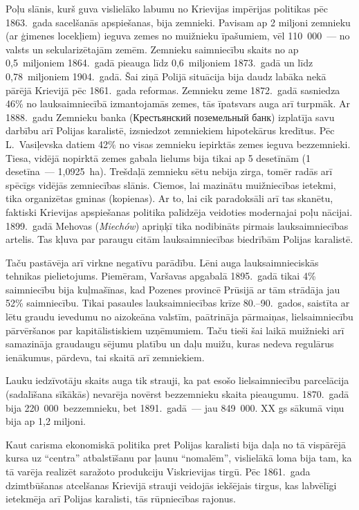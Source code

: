 \documentclass[twoside,a5paper,12pt,fleqn,openany]{extbook}
\newcommand{\pltxti}[1]{\textit{\textpolish{#1}}}
\newcommand{\rutxti}[1]{\textrussian{#1}}
\begin{document}
Poļu slānis, kurš guva vislielāko labumu no Krievijas impērijas politikas pēc 1863.~gada sacelšanās apspiešanas, bija zemnieki. Pavisam ap 2 miljoni zemnieku (ar ģimenes locekļiem) ieguva zemes no muižnieku īpašumiem, vēl 110~000~--- no valsts un sekularizētajām zemēm. Zemnieku saimniecību skaits no ap 0,5~miljoniem 1864.~gadā pieauga līdz 0,6~miljoniem 1873.~gadā un līdz 0,78~miljoniem 1904.~gadā. Šai ziņā Polijā situācija bija daudz labāka nekā pārējā Krievijā pēc 1861.~gada reformas. Zemnieku zeme 1872.~gadā sasniedza 46\% no lauksaimniecībā izmantojamās zemes, tās īpatsvars auga arī turpmāk. Ar 1888.~gadu Zemnieku banka (\rutxti{Крестьянский поземельный банк}) izplatīja savu darbību arī Polijas karalistē, izsniedzot zemniekiem hipotekārus kredītus. Pēc L.~Vasiļevska datiem 42\% no visas zemnieku iepirktās zemes ieguva bezzemnieki. Tiesa, vidējā nopirktā zemes gabala lielums bija tikai ap 5 desetīnām (1 desetīna~--- 1,0925~ha). Trešdaļā zemnieku sētu nebija zirga, tomēr radās arī spēcīgs vidējās zemniecības slānis. Ciemos, lai mazinātu muižniecības ietekmi, tika organizētas gminas (kopienas). Ar to, lai cik paradoksāli arī tas skanētu, faktiski Krievijas apspiešanas politika palīdzēja veidoties modernajai poļu nācijai. 1899.~gadā Mehovas (\pltxti{Miechów}) apriņķī tika nodibināts pirmais lauksaimniecības artelis. Tas kļuva par paraugu citām lauksaimniecības biedrībām Polijas karalistē.

Taču pastāvēja arī virkne negatīvu parādību. Lēni auga lauksaimnieciskās tehnikas pielietojums. Piemēram, Varšavas apgabalā 1895.~gadā tikai 4\% saimniecību bija kuļmašīnas, kad Pozenes provincē Prūsijā ar tām strādāja jau 52\% saimniecību. Tikai pasaules lauksaimniecības krīze 80.--90.~gados, saistīta ar lētu graudu ievedumu no aizokeāna valstīm, paātrināja pārmaiņas, lielsaimniecību pārvēršanos par kapitālistiskiem uzņēmumiem. Taču tieši šai laikā muižnieki arī samazināja graudaugu sējumu platību un daļu muižu, kuras nedeva regulārus ienākumus, pārdeva, tai skaitā arī zemniekiem.

Lauku iedzīvotāju skaits auga tik strauji, ka pat esošo lielsaimniecību parcelācija (sadalīšana sīkākās) nevarēja novērst bezzemnieku skaita pieaugumu. 1870.~gadā bija 220~000~bezzemnieku, bet 1891.~gadā~--- jau 849~000. XX gs sākumā viņu bija ap 1,2 miljoni.

Kaut carisma ekonomiskā politika pret Polijas karalisti bija daļa no tā vispārējā kursa uz ``centra'' atbalstīšanu par ļaunu ``nomalēm'',  vislielākā loma bija tam, ka tā varēja realizēt saražoto produkciju Viskrievijas tirgū. Pēc 1861.~gada dzimtbūšanas atcelšanas Krievijā strauji veidojās iekšējais tirgus, kas labvēlīgi ietekmēja arī Polijas karalisti, tās rūpniecības rajonus.
\end{document}

